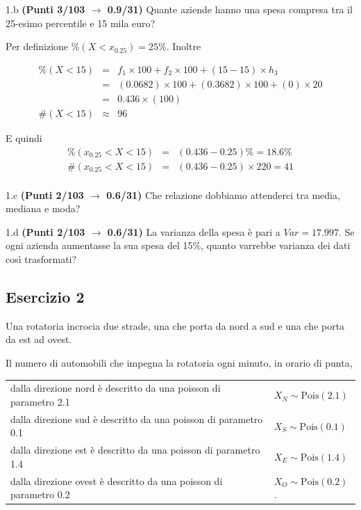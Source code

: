 \documentclass[
  11pt,
]{book}
\theoremstyle{mytheoremstyle}
\theoremstyle{mydefstyle}
\newenvironment{sol}
  {
  \begin{tcolorbox}[enhanced,breakable,arc=0.1mm,boxrule=1pt,colback=white,colframe=iblue,
  title=\bf \fontfamily{lmss}\selectfont \hspace{.5 cm} Soluzione,drop fuzzy shadow]

}{
\end{tcolorbox}
  }
\begin{document}
1.b \textbf{(Punti 3/103 \(\rightarrow\) 0.9/31)} Quante aziende hanno una spesa compresa tra il 25-esimo percentile e 15 mila euro?

\begin{sol}
Per definizione \(\%(X<x_{ 0.25 })= 25 \%\). Inoltre

\begin{eqnarray*}
   \%(X< 15 ) &=&  f_{ 1 }\times 100+f_{ 2 }\times 100 +( 15 - 15 )\times h_{ 3 } \\
                &=&  ( 0.0682 )\times 100+( 0.3682 )\times 100 +( 0 )\times  20  \\
                &=&  0.436 \times(100) \\
\#(X< 15 )    &\approx& 96 
\end{eqnarray*}

E quindi
\begin{eqnarray*}
   \%( x_{0.25} < X < 15 ) &=& ( 0.436 - 0.25 )\%= 18.6 \% \\
   \#( x_{0.25} < X < 15 ) &=& ( 0.436 - 0.25 )\times  220 = 41  \\
\end{eqnarray*}

\end{sol}

1.c \textbf{(Punti 2/103 \(\rightarrow\) 0.6/31)} Che relazione dobbiamo attenderci tra media, mediana e moda?

1.d \textbf{(Punti 2/103 \(\rightarrow\) 0.6/31)} La varianza della spesa è pari a \(Var=17.997\).
Se ogni azienda aumentasse la sua spesa del 15\%, quanto varrebbe varianza dei dati così trasformati?

\subsection{Esercizio 2}\label{esercizio-2-14}

Una rotatoria incrocia due strade, una che porta da nord a sud e una che porta da est ad ovest.

Il numero di automobili che impegna la rotatoria ogni minuto, in orario di punta,

\begin{longtable}[]{@{}
  >{\raggedright\arraybackslash}p{}
  >{\raggedright\arraybackslash}p{}@{}}
\toprule\noalign{}
\endhead
\bottomrule\noalign{}
\endlastfoot
dalla direzione nord è descritto da una poisson di parametro 2.1 & \(X_N\sim\text{Pois}(2.1)\) \\
dalla direzione sud è descritto da una poisson di parametro 0.1 & \(X_S\sim\text{Pois}(0.1)\) \\
dalla direzione est è descritto da una poisson di parametro 1.4 & \(X_E\sim\text{Pois}(1.4)\) \\
dalla direzione ovest è descritto da una poisson di parametro 0.2 & \(X_O\sim\text{Pois}(0.2)\). \\
\end{longtable}
\end{document}
